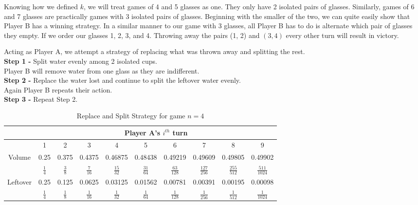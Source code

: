 \documentclass[11pt]{article}
\begin{document}
Knowing how we defined $k$, we will treat games of 4 and 5 glasses as one. They only have 2 isolated pairs of glasses. Similarly, games of 6 and 7 glasses are practically games with 3 isolated pairs of glasses. Beginning with the smaller of the two, we can quite easily show that Player B has a winning strategy. In a similar manner to our game with 3 glasses, all Player B has to do is alternate which pair of glasses they empty. If we order our glasses 1, 2, 3, and 4. Throwing away the pairs (1, 2) and $(3, 4)$ every other turn will result in victory. 

Acting as Player A, we attempt a strategy of replacing what was thrown away and splitting the rest. \\
\textbf{Step 1 -} Split water evenly among 2 isolated cups.\\
Player B will remove water from one glass as they are indifferent.  \\
\textbf{Step 2 -} Replace the water lost and continue to split the leftover water evenly. \\
Again Player B repeats their action. \\
\textbf{Step 3 -} Repeat Step 2. \\

\begin{table}[h]
    \centering
    \renewcommand{\arraystretch}{1.3}
    \begin{tabular}{|c|c|c|c|c|c|c|c|c|c|} \hline  
 & \multicolumn{9}{|c|}{Player A's $i^{th}$ turn}\\ \hline  
         &  1&  2&  3&  4&  5&  6&  7&  8& 9 \\ \hline  
         Volume&  0.25
&  0.375
&  0.4375
&  0.46875
&  0.48438
&  0.49219
&  0.49609
&  0.49805
&  0.49902
\\ \hline  
 & $\frac{ 1 }{ 4 }$
& $\frac{ 3 }{ 8 }$
& $\frac{ 7 }{ 16 }$
& $\frac{ 15 }{ 32 }$
& $\frac{ 31 }{ 64 }$
& $\frac{ 63 }{ 128 }$
& $\frac{ 127 }{ 256 }$
& $\frac{ 255 }{ 512 }$
& $\frac{ 511 }{ 1024 }$
\\ \hline  
 Leftover& 
0.25
& 0.125
& 0.0625
& 0.03125
& 0.01562
& 0.00781
& 0.00391
& 0.00195
& 0.00098
\\ \hline  
 & $\frac{ 1 }{ 4 }$ & $\frac{ 1 }{ 8 }$ & $\frac{ 1 }{ 16 }$ & $\frac{ 1 }{ 32 }$ & $\frac{ 1 }{ 64 }$ 
& $\frac{ 1 }{ 128 }$ & $\frac{ 1 }{ 256 }$ 
& $\frac{ 1 }{ 512 }$ 
& $\frac{ 1 }{ 1024 }$ \\ \hline 
    \end{tabular}
    \caption{Replace and Split Strategy for game $n=4$}
    \label{tab:my_label}
\end{table}
\end{document}
